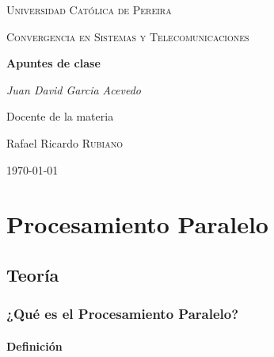 \documentclass[a4paper]{report} %
\begin{document}
  \begin{titlepage}
    \centering
    {\scshape\LARGE Universidad Católica de Pereira\par}
    \vfill
    {\scshape\LARGE Convergencia en Sistemas y Telecomunicaciones\par}
    \vfill
    {\huge\bfseries Apuntes de clase\par}
    \vfill
    {\Large\itshape Juan David Garcia Acevedo\par}
    \vfill
    Docente de la materia\par
	  Rafael Ricardo \textsc{Rubiano}
    \vfill
    {\Large\today\par}
  \end{titlepage}
  \tableofcontents %
    \part{Procesamiento Paralelo}
      \chapter{Teoría}
        \section{¿Qué es el Procesamiento Paralelo?}
          \subsection{Definición} 
\end{document}
